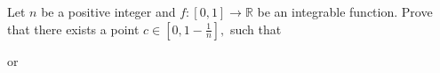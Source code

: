 Let $n$ be a positive integer and $f:[0,1] \to \mathbb{R}$ be an integrable function. Prove that there exists a point $c \in \left[0,1- \frac{1}{n} \right],$ such that

 or 

